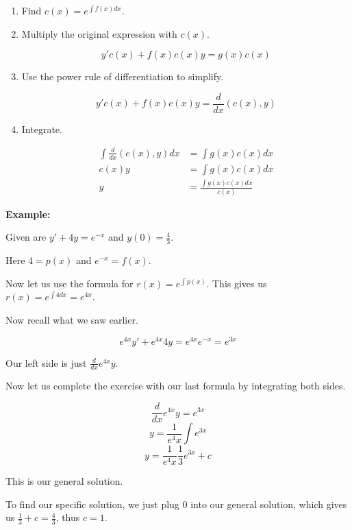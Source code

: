\begin{enumerate}

    \item Find \(c(x) = e^{\int f(x)dx}\).

    \item Multiply the original expression with \(c(x)\).

          \[
              y'c(x) + f(x)c(x)y = g(x)c(x)
          \]

    \item Use the power rule of differentiation to simplify.

          \[
              y'c(x) + f(x)c(x)y = \frac{d}{dx}\left(c(x), y\right)
          \]

    \item Integrate.

          \begin{align*}
              \int \frac{d}{dx}\left(c(x), y\right)dx & = \int g(x)c(x)dx              \\
              c(x)y                                   & = \int g(x)c(x)dx              \\
              y                                       & = \frac{\int g(x)c(x)dx}{c(x)}
          \end{align*}

\end{enumerate}

\textbf{Example:}

Given are \(y' + 4y = e^{-x}\) and \(y(0) = \frac{4}{3}\).

Here \(4 = p(x)\) and \(e^{-x} = f(x)\).

Now let us use the formula for \(r(x) = e^{\int p (x)}\). This gives us
\(r(x) = e^{\int 4dx} = e^{4x}\).

Now recall what we saw earlier.

\[
    e^{4x}y' + e^{4x}4y = e^{4x}e^{-x} = e^{3x}
\]

Our left side is just \(\frac{d}{dx} e^{4x}y\).

Now let us complete the exercise with our last formula by integrating both sides.

\[
    \frac{d}{dx} e^{4x}y = e^{3x}
\]
\[
    y = \frac{1}{e^4x}\int e^{3x}
\]
\[
    y = \frac{1}{e^4x} \frac{1}{3}e^{3x} + c
\]

This is our general solution.

To find our specific solution, we just plug 0 into our general solution, which gives us
\(\frac{1}{3} + c = \frac{4}{3}\), thus \(c = 1\).

